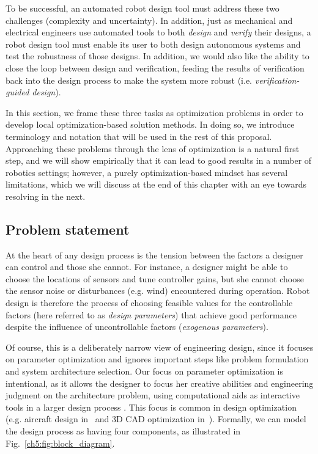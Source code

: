 To be successful, an automated robot design tool must address these two challenges (complexity and uncertainty). In addition, just as mechanical and electrical engineers use automated tools to both \textit{design} and \textit{verify} their designs, a robot design tool must enable its user to both design autonomous systems and test the robustness of those designs. In addition, we would also like the ability to close the loop between design and verification, feeding the results of verification back into the design process to make the system more robust (i.e. \textit{verification-guided design}).

In this section, we frame these three tasks as optimization problems in order to develop local optimization-based solution methods. In doing so, we introduce terminology and notation that will be used in the rest of this proposal. Approaching these problems through the lens of optimization is a natural first step, and we will show empirically that it can lead to good results in a number of robotics settings; however, a purely optimization-based mindset has several limitations, which we will discuss at the end of this chapter with an eye towards resolving in the next.

\subsection{Problem statement}



At the heart of any design process is the tension between the factors a designer can control and those she cannot. For instance, a designer might be able to choose the locations of sensors and tune controller gains, but she cannot choose the sensor noise or disturbances (e.g. wind) encountered during operation.
Robot design is therefore the process of choosing feasible values for the controllable factors (here referred to as \textit{design parameters}) that achieve good performance despite the influence of uncontrollable factors (\textit{exogenous parameters}).

Of course, this is a deliberately narrow view of engineering design, since it focuses on parameter optimization and ignores important steps like problem formulation and system architecture selection. Our focus on parameter optimization is intentional, as it allows the designer to focus her creative abilities and engineering judgment on the architecture problem, using computational aids as interactive tools in a larger design process \cite{sharpe_thesis,cascaval2021differentiable}. This focus is common in design optimization (e.g. aircraft design in~\cite{sharpe_thesis} and 3D CAD optimization in~\cite{cascaval2021differentiable}). Formally, we can model the design process as having four components, as illustrated in Fig.~\ref{ch5:fig:block_diagram}.

